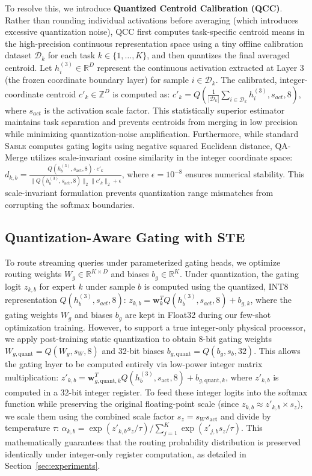 To resolve this, we introduce \textbf{Quantized Centroid Calibration (QCC)}. Rather than rounding individual activations before averaging (which introduces excessive quantization noise), QCC first computes task-specific centroid means in the high-precision continuous representation space using a tiny offline calibration dataset $\mathcal{D}_k$ for each task $k \in \{1, \dots, K\}$, and then quantizes the final averaged centroid. Let $h_i^{(3)} \in \mathbb{R}^D$ represent the continuous activation extracted at Layer 3 (the frozen coordinate boundary layer) for sample $i \in \mathcal{D}_k$. The calibrated, integer-coordinate centroid $c'_k \in \mathbb{Z}^D$ is computed as: $c'_k = Q\left( \frac{1}{|\mathcal{D}_k|} \sum_{i \in \mathcal{D}_k} h_i^{(3)}, s_{act}, 8 \right)$, where $s_{act}$ is the activation scale factor. This statistically superior estimator maintains task separation and prevents centroids from merging in low precision while minimizing quantization-noise amplification. Furthermore, while standard \textsc{Sable} computes gating logits using negative squared Euclidean distance, QA-Merge utilizes scale-invariant cosine similarity in the integer coordinate space: $d_{k, b} = \frac{Q(h_b^{(3)}, s_{\text{act}}, 8) \cdot c'_k}{\| Q(h_b^{(3)}, s_{\text{act}}, 8) \|_2 \| c'_k \|_2 + \epsilon}$, where $\epsilon = 10^{-8}$ ensures numerical stability. This scale-invariant formulation prevents quantization range mismatches from corrupting the softmax boundaries.

\subsection{Quantization-Aware Gating with STE}
To route streaming queries under parameterized gating heads, we optimize routing weights $W_g \in \mathbb{R}^{K \times D}$ and biases $b_g \in \mathbb{R}^K$. Under quantization, the gating logit $z_{k, b}$ for expert $k$ under sample $b$ is computed using the quantized, INT8 representation $Q(h_b^{(3)}, s_{act}, 8)$: $z_{k, b} = \mathbf{w}_k^T Q(h_b^{(3)}, s_{act}, 8) + b_{g, k}$, where the gating weights $W_g$ and biases $b_g$ are kept in Float32 during our few-shot optimization training. However, to support a true integer-only physical processor, we apply post-training static quantization to obtain 8-bit gating weights $W_{g, \text{quant}} = Q(W_g, s_W, 8)$ and 32-bit biases $b_{g, \text{quant}} = Q(b_g, s_b, 32)$. This allows the gating layer to be computed entirely via low-power integer matrix multiplication: $z'_{k, b} = \mathbf{w}_{g, \text{quant}, k}^T Q(h_b^{(3)}, s_{\text{act}}, 8) + b_{g, \text{quant}, k}$, where $z'_{k, b}$ is computed in a 32-bit integer register. To feed these integer logits into the softmax function while preserving the original floating-point scale (since $z_{k,b} \approx z'_{k,b} \times s_z$), we scale them using the combined scale factor $s_z = s_W s_{\text{act}}$ and divide by temperature $\tau$: $\alpha_{k, b} = \exp(z'_{k, b} s_z / \tau) / \sum_{j=1}^K \exp(z'_{j, b} s_z / \tau)$.
This mathematically guarantees that the routing probability distribution is preserved identically under integer-only register computation, as detailed in Section~\ref{sec:experiments}.

